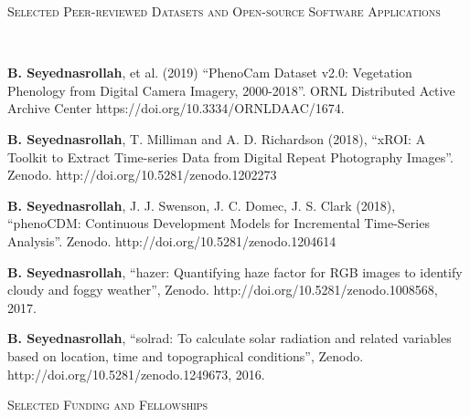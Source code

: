 \documentclass[10pt]{article}
\newenvironment{changemargin}[2]{%
  \begin{list}{}{%
 \setlength{\topsep}{0pt}%
 \setlength{\leftmargin}{#1}%
 \setlength{\rightmargin}{#2}%
 \setlength{\listparindent}{\parindent}%
 \setlength{\itemindent}{\parindent}%
 \setlength{\parsep}{\parskip}%
  }%
  \item[]}{\end{list}
}
\newcommand{\lineover}{
  \begin{changemargin}{-0.05in}{-0.05in}
  \vspace*{-8pt}
  \hrulefill \\
  \vspace*{-2pt}
  \end{changemargin}
}
\newcommand{\header}[1]{
  \begin{changemargin}{-0.5in}{-0.5in}
  \scshape{#1}\\
  \lineover
  \end{changemargin}
}
\newenvironment{body} {
  \vspace*{-2pt}
  \begin{changemargin}{-0.5in}{-0.5in}
}
{\end{changemargin}
}
\begin{document}
\smallskip
\header{Selected Peer-reviewed Datasets and Open-source Software Applications}

\begin{body}

\textbf{B. Seyednasrollah}, et al. (2019) ``PhenoCam Dataset v2.0: Vegetation Phenology from Digital Camera Imagery, 2000-2018''.  ORNL Distributed Active Archive Center https://doi.org/10.3334/ORNLDAAC/1674. \\
    \smallskip

\textbf{B. Seyednasrollah}, T. Milliman and A. D. Richardson (2018),  ``xROI: A Toolkit to Extract Time-series Data from Digital Repeat Photography Images''. Zenodo. http://doi.org/10.5281/zenodo.1202273\\
    \smallskip

\textbf{B. Seyednasrollah}, J. J. Swenson, J. C. Domec, J. S. Clark (2018),  ``phenoCDM: Continuous Development Models for Incremental Time-Series Analysis''. Zenodo. http://doi.org/10.5281/zenodo.1204614\\
    \smallskip

\textbf{B. Seyednasrollah}, ``hazer: Quantifying haze factor for RGB images to identify cloudy and foggy weather'', Zenodo. http://doi.org/10.5281/zenodo.1008568, 2017. \\ 
\smallskip

\textbf{B. Seyednasrollah}, ``solrad: To calculate solar radiation and related variables based on location, time and topographical conditions'', Zenodo. http://doi.org/10.5281/zenodo.1249673, 2016. \\

\end{body}

\smallskip


\header{Selected Funding and Fellowships}
\end{document}
